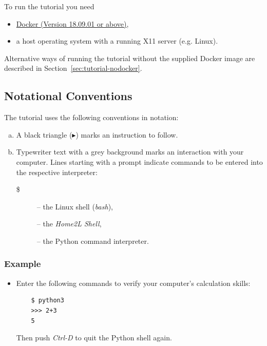 \documentclass[12pt,english,parskip=half,headheight=19pt]{scrreprt}
\newcommand{\lst}[1]{\colorbox{lstbackground}{\footnotesize\code{#1}}}
\newcommand{\lstf}[1]{\colorbox{lstbackground}{\ttfamily\footnotesize#1}}
\begin{document}
To run the tutorial you need

\begin{itemize}
  \item \href{https://en.wikipedia.org/wiki/Docker_(software)}{Docker (Version 18.09.01 or above)},
  \item a host operating system with a running X11 server (e.g. Linux).
\end{itemize}

Alternative ways of running the tutorial without the supplied Docker image are described in Section~\ref{sec:tutorial-nodocker}.



\subsection{Notational Conventions}

The tutorial uses the following conventions in notation:

\begin{enumerate}[a)]
  \item A black triangle ($\blacktriangleright$) marks an instruction to follow.
  \item \lstf{Typewriter text with a grey background} marks an interaction with your computer.
    Lines starting with a prompt indicate commands to be entered into the respective
    interpreter:
    \begin{description}
      \item[\lstf{\$}] -- the Linux shell (\textit{bash}),
      \item[\lst{home2l>}] -- the \textit{Home2L Shell},
      \item[\lst{>>>}] -- the Python command interpreter.
    \end{description}
\end{enumerate}


\subsubsection*{Example}

\begin{itemize}[$\blacktriangleright$]
  \item Enter the following commands to verify your computer's calculation skills:
    \begin{lstlisting}
    $ python3
    >>> 2+3
    5
    \end{lstlisting}
    Then push \textit{Ctrl-D} to quit the Python shell again.
\end{itemize}
\end{document}

